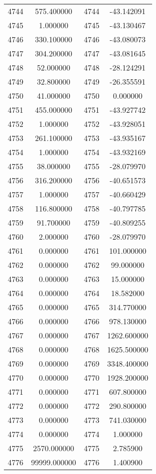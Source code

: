 \documentclass[12pt]{article}
\begin{document}
\begin{longtable}{@{}cccc@{}}
4744 & 575.400000 & 4744 & -43.142091 \\
4745 & 1.000000 & 4745 & -43.130467 \\
4746 & 330.100000 & 4746 & -43.080073 \\
4747 & 304.200000 & 4747 & -43.081645 \\
4748 & 52.000000 & 4748 & -28.124291 \\
4749 & 32.800000 & 4749 & -26.355591 \\
4750 & 41.000000 & 4750 & 0.000000 \\
4751 & 455.000000 & 4751 & -43.927742 \\
4752 & 1.000000 & 4752 & -43.928051 \\
4753 & 261.100000 & 4753 & -43.935167 \\
4754 & 1.000000 & 4754 & -43.932169 \\
4755 & 38.000000 & 4755 & -28.079970 \\
4756 & 316.200000 & 4756 & -40.651573 \\
4757 & 1.000000 & 4757 & -40.660429 \\
4758 & 116.800000 & 4758 & -40.797785 \\
4759 & 91.700000 & 4759 & -40.809255 \\
4760 & 2.000000 & 4760 & -28.079970 \\
4761 & 0.000000 & 4761 & 101.000000 \\
4762 & 0.000000 & 4762 & 99.000000 \\
4763 & 0.000000 & 4763 & 15.000000 \\
4764 & 0.000000 & 4764 & 18.582000 \\
4765 & 0.000000 & 4765 & 314.770000 \\
4766 & 0.000000 & 4766 & 978.130000 \\
4767 & 0.000000 & 4767 & 1262.600000 \\
4768 & 0.000000 & 4768 & 1625.500000 \\
4769 & 0.000000 & 4769 & 3348.400000 \\
4770 & 0.000000 & 4770 & 1928.200000 \\
4771 & 0.000000 & 4771 & 607.800000 \\
4772 & 0.000000 & 4772 & 290.800000 \\
4773 & 0.000000 & 4773 & 741.030000 \\
4774 & 0.000000 & 4774 & 1.000000 \\
4775 & 2570.000000 & 4775 & 2.785900 \\
4776 & 99999.000000 & 4776 & 1.400900 \\

\end{longtable}
\end{document}
